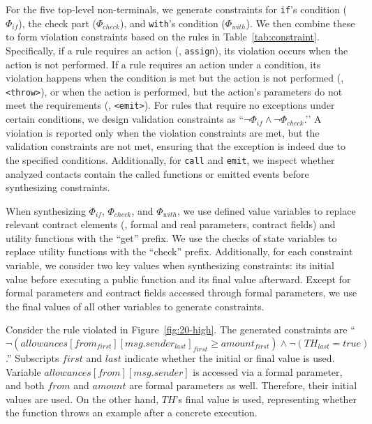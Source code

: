 


For the five top-level non-terminals, we generate constraints for \texttt{if}’s condition ($\Phi_{if}$), 
the check part ($\Phi_{check}$), 
and \texttt{with}’s condition 
($\Phi_{with}$). 
We then combine these to form violation constraints based on the 
rules in Table~\ref{tab:constraint}.
Specifically, if a rule requires an action (\eg, \texttt{assign}), 
its violation occurs when the action is not performed. 
If a rule requires an action under a condition, its violation happens when
the condition is met but the action is not performed (\eg, \texttt{<throw>}), or when
the action is performed, but the action’s parameters do not meet the 
requirements (\eg, \texttt{<emit>}). 
For rules that require no exceptions under certain conditions, we design validation constraints as ``$\neg \Phi_{if} \land \neg \Phi_{check}$.’’ 
A violation is 
reported only when the violation constraints are met, 
but the validation constraints are not met, 
ensuring that the exception is indeed due to the specified conditions.
Additionally, for \texttt{call} and \texttt{emit}, we inspect whether analyzed 
contacts contain the called functions or emitted events before synthesizing constraints. 





When synthesizing $\Phi_{if}$, $\Phi_{check}$, and $\Phi_{with}$, 
we use defined value variables to replace relevant contract elements 
(\eg, formal and real parameters, 
contract fields) and utility functions with the ``get'' prefix. 
We use the checks of state variables to replace utility functions 
with the ``check'' prefix. 
Additionally, for each constraint variable, we consider two key values when synthesizing constraints: 
its initial value before executing a public function 
and its final value afterward. 
Except for formal parameters and 
contract fields accessed through formal parameters, 
we use the final values of all other variables 
to generate constraints.



Consider the rule violated in Figure~\ref{fig:20-high}. 
The generated constraints are 
``$\neg (allowances[from_{first}][msg.sender_{last}]_{first} \geq 
amount_{first}) \land \neg (TH_{last} = true)$.'' 
Subscripts $first$ and $last$ 
indicate whether the initial or final value is used. Variable $allowances[from][msg.sender]$ %
is accessed via a formal parameter, and both $from$ and $amount$ are formal parameters as well. Therefore, their initial values are used. 
On the other hand, $TH$'s final value is used, representing whether 
the function throws an example after a concrete execution. 


